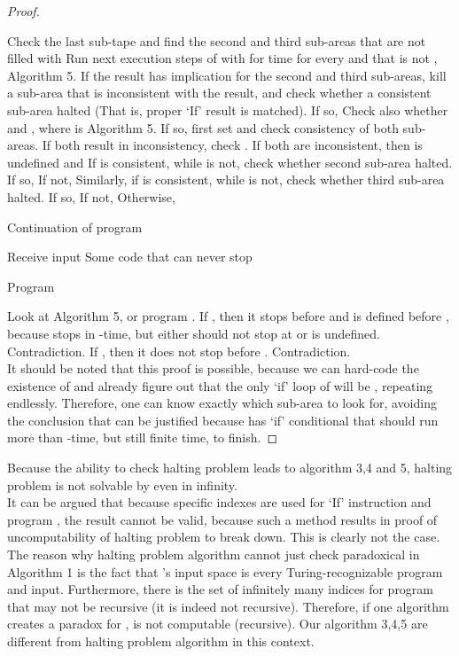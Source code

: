 \documentclass{roffin}
\begin{document}
\begin{proof}
\begin{algorithm}
\end{algorithm}
\begin{algorithm}
 {
 Check the last sub-tape and find the second and third sub-areas that are not filled with \;
 {Run next execution steps of  with  for time  for every  and  that is not , Algorithm 5. If the result has implication for the second and third sub-areas, kill a sub-area that is inconsistent with the result, and check whether a consistent sub-area halted (That is, proper `If' result is matched). If so, \; Check also whether  and , where  is Algorithm 5. If so, first set  and check consistency of both sub-areas. If both result in inconsistency, check . If both are inconsistent, then  is undefined and \; If  is consistent, while  is not, check whether second sub-area halted. If so, \; If not, \; Similarly, if  is consistent, while  is not, check whether third sub-area halted. If so, \; If not, \; Otherwise, \;}
 }
 \caption{Continuation of program }
\end{algorithm}
\begin{algorithm}
Receive input \;
{Some code that can never stop\;}
\caption{Program }
\end{algorithm}
Look at Algorithm 5, or program . If , then it stops before  and  is defined before , because  stops in -time, but  either should not stop at  or  is undefined. Contradiction. If , then it does not stop before . Contradiction.\\
It should be noted that this proof is possible, because we can hard-code the existence of  and already figure out that the only `if' loop of  will be , repeating endlessly. Therefore, one can know exactly which sub-area to look for, avoiding the conclusion that  can be justified because  has `if' conditional that should run more than -time, but still finite time, to finish. 
\end{proof}
Because the ability to check halting problem leads to algorithm 3,4 and 5, halting problem is not solvable by  even in infinity.\\
It can be argued that because specific indexes are used for `If' instruction and program , the result cannot be valid, because such a method results in proof of uncomputability of halting problem to break down. This is clearly not the case. The reason why halting problem algorithm  cannot just check paradoxical  in Algorithm 1 is the fact that 's input space is every Turing-recognizable program and input. Furthermore, there is the set of infinitely many indices for program  that may not be recursive (it is indeed not recursive). Therefore, if one algorithm  creates a paradox for ,  is not computable (recursive). Our algorithm 3,4,5 are different from halting problem algorithm in this context.\\ 
\end{document}
